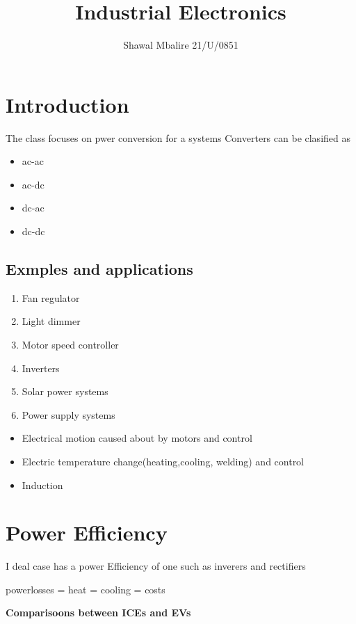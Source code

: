 \documentclass{article}
\title{Industrial Electronics}
\author{Shawal Mbalire 21/U/0851}
\begin{document}
    \maketitle
    \tableofcontents
    \newpage

    \section{Introduction}
    The class focuses on pwer conversion for a systems
    Converters can be clasified as
    \begin{itemize}
        \item ac-ac 
        \item ac-dc 
        \item dc-ac 
        \item dc-dc 
    \end{itemize}
    \subsection{Exmples and applications}
    \begin{enumerate}
        \item Fan regulator
        \item Light dimmer
        \item Motor speed controller
        \item Inverters
        \item Solar power systems
        \item Power supply systems
    \end{enumerate}

    \begin{itemize}
        \item Electrical motion caused about by motors and control
        \item Electric temperature change(heating,cooling, welding) and control
        \item Induction
    \end{itemize}

    \section{Power Efficiency}
    I deal case has a power Efficiency of one such as inverers and rectifiers

    powerlosses = heat = cooling = costs

    \textbf{Comparisoons between ICEs and EVs}
\end{document}
